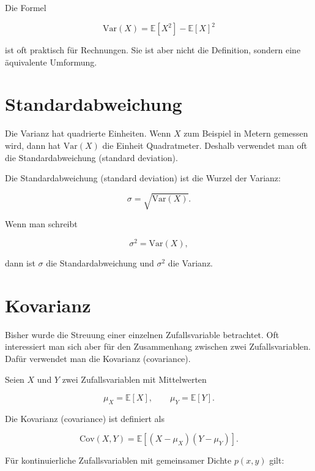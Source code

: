 \begin{examtipbox}
Die Formel

\[
    \mathrm{Var}(X)
    =
    \mathbb{E}[X^2]
    -
    \mathbb{E}[X]^2
\]

ist oft praktisch für Rechnungen.
Sie ist aber nicht die Definition, sondern eine äquivalente Umformung.
\end{examtipbox}

\section{Standardabweichung}

Die Varianz hat quadrierte Einheiten.
Wenn \(X\) zum Beispiel in Metern gemessen wird, dann hat \(\mathrm{Var}(X)\) die Einheit Quadratmeter.
Deshalb verwendet man oft die Standardabweichung (standard deviation).

\begin{definitionbox}
Die Standardabweichung (standard deviation) ist die Wurzel der Varianz:

\[
    \sigma
    =
    \sqrt{\mathrm{Var}(X)}.
\]
\end{definitionbox}

Wenn man schreibt

\[
    \sigma^2 = \mathrm{Var}(X),
\]

dann ist \(\sigma\) die Standardabweichung und \(\sigma^2\) die Varianz.

\section{Kovarianz}

Bisher wurde die Streuung einer einzelnen Zufallsvariable betrachtet.
Oft interessiert man sich aber für den Zusammenhang zwischen zwei Zufallsvariablen.
Dafür verwendet man die Kovarianz (covariance).

\begin{definitionbox}
Seien \(X\) und \(Y\) zwei Zufallsvariablen mit Mittelwerten

\[
    \mu_X = \mathbb{E}[X],
    \qquad
    \mu_Y = \mathbb{E}[Y].
\]

Die Kovarianz (covariance) ist definiert als

\[
    \mathrm{Cov}(X,Y)
    =
    \mathbb{E}\left[(X-\mu_X)(Y-\mu_Y)\right].
\]
\end{definitionbox}

Für kontinuierliche Zufallsvariablen mit gemeinsamer Dichte \(p(x,y)\) gilt:

